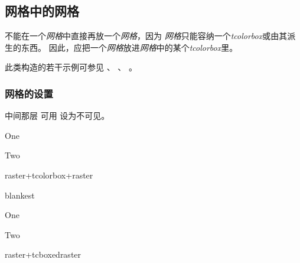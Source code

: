 \clearpage
\subsection{网格中的网格}\label{subsec:raster_insideraster}

不能在一个\emph{网格}中直接再放一个\emph{网格}，因为
\emph{网格}只能容纳一个\emph{tcolorbox}或由其派生的东西。
因此，应把一个\emph{网格}放进\emph{网格}中的某个\emph{tcolorbox}里。

此类构造的若干示例可参见 、
、
。


\subsubsection{网格的设置}
中间那层  可用  设为不可见。

\begin{dispExample}
\begin{tcbraster}[raster equal height=rows,
  raster every box/.style={colframe=red!50!black,colback=red!10!white}]
  \begin{tcolorbox}[blankest]
    \begin{tcbraster}[raster columns=1]
      \begin{tcolorbox}One\end{tcolorbox}
      \begin{tcolorbox}Two\end{tcolorbox}
    \end{tcbraster}
  \end{tcolorbox}
  \begin{tcolorbox}raster+tcolorbox+raster\end{tcolorbox}
\end{tcbraster}
\end{dispExample}

\enlargethispage*{1cm}
\begin{dispExample}
\begin{tcbraster}[raster equal height=rows,
  raster every box/.style={colframe=red!50!black,colback=red!10!white}]
  \begin{tcboxedraster}[raster columns=1]{blankest}
    \begin{tcolorbox}One\end{tcolorbox}
    \begin{tcolorbox}Two\end{tcolorbox}
  \end{tcboxedraster}
  \begin{tcolorbox}raster+tcboxedraster\end{tcolorbox}
\end{tcbraster}
\end{dispExample}


